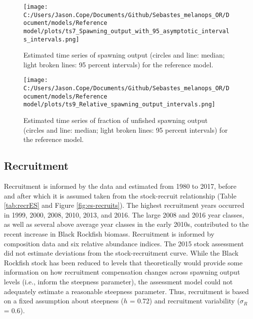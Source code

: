 \documentclass[11pt,
  letterpaper,
]{article}
\begin{document}


\begin{figure}
{\centering
\texttt{[image: C:/Users/Jason.Cope/Documents/Github/Sebastes\_melanops\_OR/Document/models/Reference model/plots/ts7\_Spawning\_output\_with\_95\_asymptotic\_intervals\_intervals.png]}
}
\caption{Estimated time series of spawning output (circles and line: median; light broken lines: 95 percent intervals) for the reference model.\label{fig:es-ssb}}
\end{figure}

\begin{figure}
{\centering
\texttt{[image: C:/Users/Jason.Cope/Documents/Github/Sebastes\_melanops\_OR/Document/models/Reference model/plots/ts9\_Relative\_spawning\_output\_intervals.png]}
}
\caption{Estimated time series of fraction of unfished spawning output (circles and line: median; light broken lines: 95 percent intervals) for the reference model.\label{fig:es-depl}}
\end{figure}

\clearpage

\hypertarget{recruitment}{%
\subsection*{Recruitment}\label{recruitment}}

Recruitment is informed by the data and estimated from 1980 to 2017, before and after which it is assumed taken from the stock-recruit relationship (Table \ref{tab:recrES} and Figure \ref{fig:es-recruits}). The highest recruitment years occurred in 1999, 2000, 2008, 2010, 2013, and 2016. The large 2008 and 2016 year classes, as well as several above average year classes in the early 2010s, contributed to the recent increase in Black Rockfish biomass. Recruitment is informed by composition data and six relative abundance indices. The 2015 stock assessment did not estimate deviations from the stock-recruitment curve. While the Black Rockfish stock has been reduced to levels that theoretically would provide some information on how recruitment compensation changes across spawning output levels (i.e., inform the steepness parameter), the assessment model could not adequately estimate a reasonable steepness parameter. Thus, recruitment is based on a fixed assumption about steepness (\(h\) = 0.72) and recruitment variability (\(\sigma_R\) = 0.6).
\end{document}

